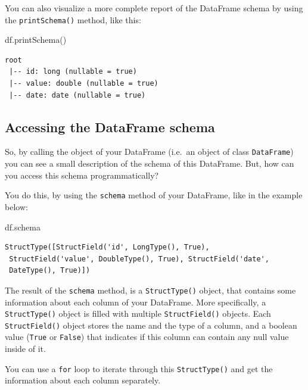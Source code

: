\documentclass[
  11pt,
  letterpaper,
  DIV=11,
  numbers=noendperiod]{scrreprt}
\newenvironment{Shaded}{\begin{snugshade}}{\end{snugshade}}
\newcommand{\NormalTok}[1]{\textcolor[rgb]{0.00,0.23,0.31}{#1}}
\begin{document}
You can also visualize a more complete report of the DataFrame schema by
using the \texttt{printSchema()} method, like this:

\begin{Shaded}
\begin{Highlighting}[]
\NormalTok{df.printSchema()}
\end{Highlighting}
\end{Shaded}

\begin{verbatim}
root
 |-- id: long (nullable = true)
 |-- value: double (nullable = true)
 |-- date: date (nullable = true)
\end{verbatim}

\subsection{Accessing the DataFrame
schema}\label{accessing-the-dataframe-schema}

So, by calling the object of your DataFrame (i.e.~an object of class
\texttt{DataFrame}) you can see a small description of the schema of
this DataFrame. But, how can you access this schema programmatically?

You do this, by using the \texttt{schema} method of your DataFrame, like
in the example below:

\begin{Shaded}
\begin{Highlighting}[]
\NormalTok{df.schema}
\end{Highlighting}
\end{Shaded}

\begin{verbatim}
StructType([StructField('id', LongType(), True), 
 StructField('value', DoubleType(), True), StructField('date', 
 DateType(), True)])
\end{verbatim}

The result of the \texttt{schema} method, is a \texttt{StructType()}
object, that contains some information about each column of your
DataFrame. More specifically, a \texttt{StructType()} object is filled
with multiple \texttt{StructField()} objects. Each
\texttt{StructField()} object stores the name and the type of a column,
and a boolean value (\texttt{True} or \texttt{False}) that indicates if
this column can contain any null value inside of it.

You can use a \texttt{for} loop to iterate through this
\texttt{StructType()} and get the information about each column
separately.
\end{document}
